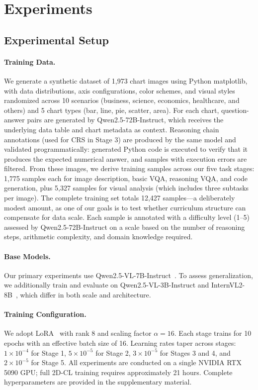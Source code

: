 \documentclass[journal]{IEEEtran}
\newcommand{\method}{2D-CL}
\newcommand{\crs}{CRS}
\begin{document}
\section{Experiments}
\subsection{Experimental Setup}
\label{sec:setup}
\paragraph{Training Data.}
We generate a synthetic dataset of 1,973 chart images using Python matplotlib, with data distributions, axis configurations, color schemes, and visual styles randomized across 10 scenarios (business, science, economics, healthcare, and others) and 5 chart types (bar, line, pie, scatter, area). For each chart, question-answer pairs are generated by Qwen2.5-72B-Instruct, which receives the underlying data table and chart metadata as context. Reasoning chain annotations (used for \crs{} in Stage 3) are produced by the same model and validated programmatically: generated Python code is executed to verify that it produces the expected numerical answer, and samples with execution errors are filtered. From these images, we derive training samples across our five task stages: 1,775 samples each for image description, basic VQA, reasoning VQA, and code generation, plus 5,327 samples for visual analysis (which includes three subtasks per image). The complete training set totals 12,427 samples---a deliberately modest amount, as one of our goals is to test whether curriculum structure can compensate for data scale. Each sample is annotated with a difficulty level (1--5) assessed by Qwen2.5-72B-Instruct on a scale based on the number of reasoning steps, arithmetic complexity, and domain knowledge required.

\paragraph{Base Models.}
Our primary experiments use Qwen2.5-VL-7B-Instruct~\cite{bai2023qwen}. To assess generalization, we additionally train and evaluate on Qwen2.5-VL-3B-Instruct and InternVL2-8B~\cite{chen2024internvl}, which differ in both scale and architecture.

\paragraph{Training Configuration.}
We adopt LoRA~\cite{hu2022lora} with rank 8 and scaling factor $\alpha=16$. Each stage trains for 10 epochs with an effective batch size of 16. Learning rates taper across stages: $1\times10^{-4}$ for Stage 1, $5\times10^{-5}$ for Stage 2, $3\times10^{-5}$ for Stages 3 and 4, and $2\times10^{-5}$ for Stage 5. All experiments are conducted on a single NVIDIA RTX 5090 GPU; full \method{} training requires approximately 21 hours. Complete hyperparameters are provided in the supplementary material.
\end{document}
